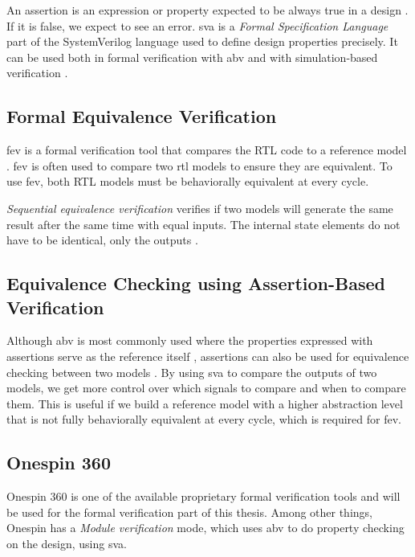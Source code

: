 An assertion is an expression or property expected to be always true in a design \cite{mehtaSystemVerilogAssertions2020}. If it is false, we expect to see an error. 
\acrfull{sva} is a \textit{Formal Specification Language} part of the SystemVerilog language used to define design properties precisely. It can be used both in formal verification with \acrfull{abv} and with simulation-based verification \cite{cernySVAPowerAssertions2015}.

\subsection{Formal Equivalence Verification}

\acrfull{fev} is a formal verification tool that compares the RTL code to a reference model \cite{seligmanFormalVerificationEssential2015}. \acrshort{fev} is often used to compare two \acrshort{rtl} models to ensure they are equivalent. To use \acrshort{fev}, both RTL models must be behaviorally equivalent at every cycle.

\textit{Sequential equivalence verification} verifies if two models will generate the same result after the same time with equal inputs. The internal state elements do not have to be identical, only the outputs \cite{seligmanFormalVerificationEssential2015}.


\subsection{Equivalence Checking using Assertion-Based Verification}
\label{sec:bg_eq_abv}

Although \acrshort{abv} is most commonly used where the properties expressed with assertions serve as the reference itself \cite{seligmanFormalVerificationEssential2015}, assertions can also be used for equivalence checking between two models \cite{kumarEquivalenceCheckingUsing2015}. By using \acrshort{sva} to compare the outputs of two models, we get more control over which signals to compare and when to compare them. This is useful if we build a reference model with a higher abstraction level that is not fully behaviorally equivalent at every cycle, which is required for \acrshort{fev}.


\subsection{Onespin 360}

Onespin 360 \cite{onespinsolutionsgmbhUserManualOneSpin} is one of the available proprietary formal verification tools and will be used for the formal verification part of this thesis. Among other things, Onespin has a \textit{Module verification} mode, which uses \acrshort{abv} to do property checking on the design, using \acrfull{sva}.

